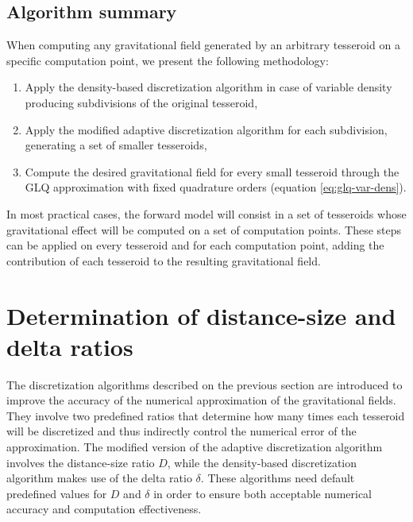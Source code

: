 \documentclass[extra]{gji}
\begin{document}
\subsection{Algorithm summary}

When computing any gravitational field generated by an arbitrary tesseroid on 
a specific computation point, we present the following methodology:

\begin{enumerate}
    \renewcommand{\theenumi}{(\arabic{enumi})}
    \item Apply the density-based discretization algorithm in case of 
          variable density producing subdivisions of the original tesseroid,
    \item Apply the modified adaptive discretization algorithm for 
          each subdivision, generating a set of smaller tesseroids,
    \item Compute the desired gravitational field for every small tesseroid 
          through the GLQ approximation with fixed quadrature orders
          (equation \ref{eq:glq-var-dens}).
\end{enumerate}

In most practical cases, the forward model will consist in a set of 
tesseroids whose gravitational effect will be computed on a set of 
computation points.
These steps can be applied on every tesseroid and for each computation point,
adding the contribution of each tesseroid to the resulting 
gravitational field.



\section{Determination of distance-size and delta ratios}

The discretization algorithms described on the previous section are 
introduced to improve the accuracy of the numerical approximation of 
the gravitational fields.
They involve two predefined ratios that determine how many 
times each tesseroid will be discretized and thus indirectly control 
the numerical error of the approximation.
The modified version of the adaptive discretization algorithm involves  
the distance-size ratio $D$, while the density-based discretization 
algorithm makes use of the delta ratio $\delta$.
These algorithms need default predefined values for $D$ and $\delta$ 
in order to ensure both acceptable numerical accuracy and computation 
effectiveness.
\end{document}
